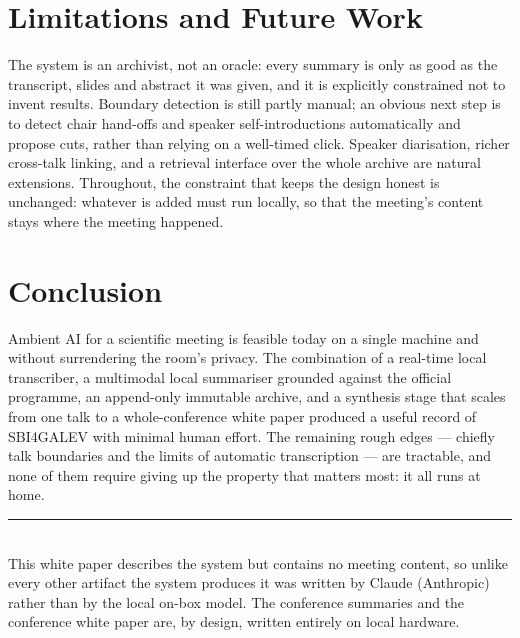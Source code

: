 \documentclass[11pt]{article}
\begin{document}
\section{Limitations and Future Work}
The system is an archivist, not an oracle: every summary is only as good as the
transcript, slides and abstract it was given, and it is explicitly constrained
not to invent results. Boundary detection is still partly manual; an obvious next
step is to detect chair hand-offs and speaker self-introductions automatically
and propose cuts, rather than relying on a well-timed click. Speaker
diarisation, richer cross-talk linking, and a retrieval interface over the whole
archive are natural extensions. Throughout, the constraint that keeps the design
honest is unchanged: whatever is added must run locally, so that the meeting's
content stays where the meeting happened.

\section{Conclusion}
Ambient AI for a scientific meeting is feasible today on a single machine and
without surrendering the room's privacy. The combination of a real-time local
transcriber, a multimodal local summariser grounded against the official
programme, an append-only immutable archive, and a synthesis stage that scales
from one talk to a whole-conference white paper produced a useful record of
SBI4GALEV with minimal human effort. The remaining rough edges --- chiefly talk
boundaries and the limits of automatic transcription --- are tractable, and none
of them require giving up the property that matters most: it all runs at home.

\vspace{1em}
\noindent\rule{\linewidth}{0.4pt}\\
{\small This white paper describes the system but contains no meeting content,
so unlike every other artifact the system produces it was written by Claude
(Anthropic) rather than by the local on-box model. The conference summaries and
the conference white paper are, by design, written entirely on local hardware.}
\end{document}

